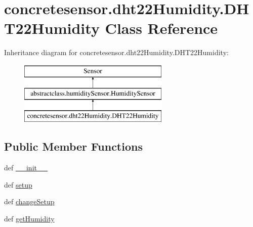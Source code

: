 \hypertarget{classconcretesensor_1_1dht22Humidity_1_1DHT22Humidity}{}\section{concretesensor.\+dht22\+Humidity.\+D\+H\+T22\+Humidity Class Reference}
\label{classconcretesensor_1_1dht22Humidity_1_1DHT22Humidity}
Inheritance diagram for concretesensor.\+dht22\+Humidity.\+D\+H\+T22\+Humidity\+:\begin{figure}[H]
\begin{center}
\leavevmode
\includegraphics[height=3.000000cm]{classconcretesensor_1_1dht22Humidity_1_1DHT22Humidity}
\end{center}
\end{figure}
\subsection*{Public Member Functions}
\begin{DoxyCompactItemize}
\item 
def \hyperlink{classconcretesensor_1_1dht22Humidity_1_1DHT22Humidity_aac6d08610e3f87e56de17bddc4e74bcf}{\+\_\+\+\_\+init\+\_\+\+\_\+}
\item 
def \hyperlink{classconcretesensor_1_1dht22Humidity_1_1DHT22Humidity_a7f169ea568632c49b1ade54229e6df5f}{setup}
\item 
def \hyperlink{classconcretesensor_1_1dht22Humidity_1_1DHT22Humidity_a791aa8e524acf4dab70511e1b3ac31ba}{change\+Setup}
\item 
def \hyperlink{classconcretesensor_1_1dht22Humidity_1_1DHT22Humidity_ad256ded1637410ec95061fd8e0144e38}{get\+Humidity}
\end{DoxyCompactItemize}
